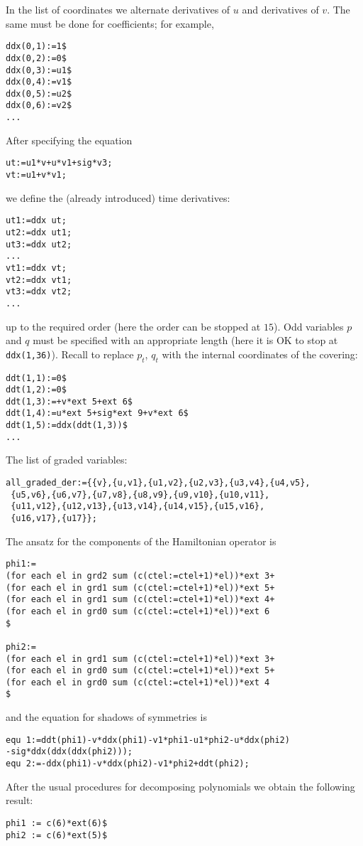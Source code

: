 In the list of coordinates we alternate derivatives of $u$ and derivatives of
$v$. The same must be done for coefficients; for example,
\begin{verbatim}
ddx(0,1):=1$
ddx(0,2):=0$
ddx(0,3):=u1$
ddx(0,4):=v1$
ddx(0,5):=u2$
ddx(0,6):=v2$
...
\end{verbatim}
After specifying the equation
\begin{verbatim}
ut:=u1*v+u*v1+sig*v3;
vt:=u1+v*v1;
\end{verbatim}
we define the (already introduced) time derivatives:
\begin{verbatim}
ut1:=ddx ut;
ut2:=ddx ut1;
ut3:=ddx ut2;
...
vt1:=ddx vt;
vt2:=ddx vt1;
vt3:=ddx vt2;
...
\end{verbatim}
up to the required order (here the order can be stopped at $15$).  Odd
variables $p$ and $q$ must be specified with an appropriate length (here it is
OK to stop at \texttt{ddx(1,36)}). Recall to replace $p_t$, $q_t$ with the
internal coordinates of the covering:
\begin{verbatim}
ddt(1,1):=0$
ddt(1,2):=0$
ddt(1,3):=+v*ext 5+ext 6$
ddt(1,4):=u*ext 5+sig*ext 9+v*ext 6$
ddt(1,5):=ddx(ddt(1,3))$
...
\end{verbatim}
The list of graded variables:
\begin{verbatim}
all_graded_der:={{v},{u,v1},{u1,v2},{u2,v3},{u3,v4},{u4,v5},
 {u5,v6},{u6,v7},{u7,v8},{u8,v9},{u9,v10},{u10,v11},
 {u11,v12},{u12,v13},{u13,v14},{u14,v15},{u15,v16},
 {u16,v17},{u17}};
\end{verbatim}
The ansatz for the components of the Hamiltonian operator is
\begin{verbatim}
phi1:=
(for each el in grd2 sum (c(ctel:=ctel+1)*el))*ext 3+
(for each el in grd1 sum (c(ctel:=ctel+1)*el))*ext 5+
(for each el in grd1 sum (c(ctel:=ctel+1)*el))*ext 4+
(for each el in grd0 sum (c(ctel:=ctel+1)*el))*ext 6
$

phi2:=
(for each el in grd1 sum (c(ctel:=ctel+1)*el))*ext 3+
(for each el in grd0 sum (c(ctel:=ctel+1)*el))*ext 5+
(for each el in grd0 sum (c(ctel:=ctel+1)*el))*ext 4
$
\end{verbatim}
and the equation for shadows of symmetries is
\begin{verbatim}
equ 1:=ddt(phi1)-v*ddx(phi1)-v1*phi1-u1*phi2-u*ddx(phi2)
-sig*ddx(ddx(ddx(phi2)));
equ 2:=-ddx(phi1)-v*ddx(phi2)-v1*phi2+ddt(phi2);
\end{verbatim}
After the usual procedures for decomposing polynomials we obtain the following
result:
\begin{verbatim}
phi1 := c(6)*ext(6)$
phi2 := c(6)*ext(5)$
\end{verbatim}
